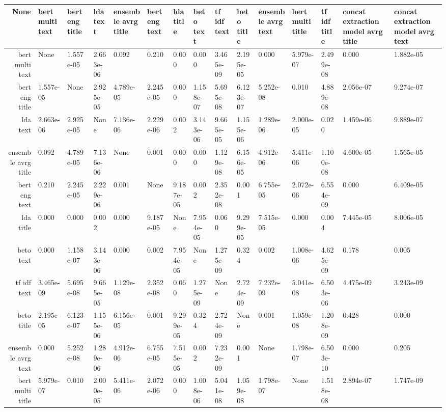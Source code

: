 \begin{tabular}{|r|l|l|l|l|l|l|l|l|l|l|l|l|l|l|}
  \hline
  None & bert multi text & bert eng title & lda text & ensemble avrg title & bert eng text & lda title & beto text & tf idf text & beto title & ensemble avrg text & bert multi title & tf idf title & concat extraction model avrg title & concat extraction model avrg text \\ 
  \hline
  bert multi text & None & 1.557e-05 & 2.663e-06 & 0.092 & 0.210 & 0.000 & 0.000 & 3.465e-09 & 2.195e-05 & 0.000 & 5.979e-07 & 2.499e-08 & 0.000 & 1.882e-05 \\ 
  \hline
  bert eng title & 1.557e-05 & None & 2.925e-05 & 4.789e-05 & 2.245e-05 & 0.000 & 1.158e-07 & 5.695e-08 & 6.123e-07 & 5.252e-08 & 0.010 & 4.889e-08 & 2.056e-07 & 9.274e-07 \\ 
  \hline
  lda text & 2.663e-06 & 2.925e-05 & None & 7.136e-06 & 2.229e-06 & 0.002 & 3.143e-06 & 9.665e-05 & 1.155e-06 & 1.289e-06 & 2.000e-05 & 0.020 & 1.459e-06 & 9.889e-07 \\ 
  \hline
  ensemble avrg title & 0.092 & 4.789e-05 & 7.136e-06 & None & 0.001 & 0.000 & 0.000 & 1.129e-08 & 6.156e-05 & 4.912e-06 & 5.411e-06 & 1.100e-08 & 4.600e-05 & 1.565e-05 \\ 
  \hline
  bert eng text & 0.210 & 2.245e-05 & 2.229e-06 & 0.001 & None & 9.187e-05 & 0.002 & 2.352e-08 & 0.001 & 6.755e-05 & 2.072e-06 & 6.554e-09 & 0.000 & 6.409e-05 \\ 
  \hline
  lda title & 0.000 & 0.000 & 0.002 & 0.000 & 9.187e-05 & None & 7.954e-05 & 0.060 & 9.299e-05 & 7.515e-05 & 0.000 & 0.004 & 7.445e-05 & 8.006e-05 \\ 
  \hline
  beto text & 0.000 & 1.158e-07 & 3.143e-06 & 0.000 & 0.002 & 7.954e-05 & None & 1.275e-09 & 0.324 & 0.002 & 1.008e-06 & 4.625e-09 & 0.178 & 0.005 \\ 
  \hline
  tf idf text & 3.465e-09 & 5.695e-08 & 9.665e-05 & 1.129e-08 & 2.352e-08 & 0.060 & 1.275e-09 & None & 2.724e-09 & 7.232e-09 & 5.041e-08 & 6.503e-06 & 4.475e-09 & 3.243e-09 \\ 
  \hline
  beto title & 2.195e-05 & 6.123e-07 & 1.155e-06 & 6.156e-05 & 0.001 & 9.299e-05 & 0.324 & 2.724e-09 & None & 0.001 & 1.059e-08 & 1.208e-09 & 0.428 & 0.000 \\ 
  \hline
  ensemble avrg text & 0.000 & 5.252e-08 & 1.289e-06 & 4.912e-06 & 6.755e-05 & 7.515e-05 & 0.002 & 7.232e-09 & 0.001 & None & 1.798e-07 & 6.503e-10 & 0.000 & 0.205 \\ 
  \hline
  bert multi title & 5.979e-07 & 0.010 & 2.000e-05 & 5.411e-06 & 2.072e-06 & 0.000 & 1.008e-06 & 5.041e-08 & 1.059e-08 & 1.798e-07 & None & 1.518e-08 & 2.894e-07 & 1.747e-09 \\ 

\end{tabular}
